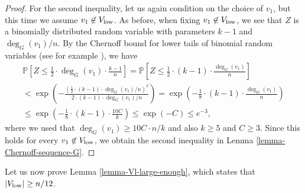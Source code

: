 \begin{proof}
For the second inequality, let us again condition on the choice of $v_1$, but this time we assume $v_1\not\in V_{\textnormal{low}}$. As before, when fixing $v_1\not\in V_{\textnormal{low}}$, we see that $Z$ is a binomially distributed random variable with parameters $k-1$ and $\deg_G(v_1)/n$. By the Chernoff bound for lower tails of binomial random variables (see for example \cite[Corollary A.1.13]{alon-spencer}), we have
\begin{multline*}
\mathbb{P}\left[Z\leq \frac{1}{2}\cdot \deg_G(v_1)\cdot \frac{k-1}{n}\right] =
\mathbb{P}\left[Z\leq \frac{1}{2}\cdot (k-1) \cdot \frac{\deg_G(v_1)}{n}\right]\\
<\exp\left(-\frac{\left(\frac{1}{2}\cdot (k-1)\cdot \deg_G(v_1)/n\right)^2}{2\cdot (k-1)\cdot \deg_G(v_1)/n}\right)=\exp\left(-\frac{1}{8}\cdot (k-1)\cdot \frac{\deg_G(v_1)}{n}\right)\\
\leq \exp\left(-\frac{1}{8}\cdot (k-1)\cdot \frac{10C}{k}\right)\leq \exp\left(-C\right)\leq e^{-3},
\end{multline*}
where we used that $\deg_G(v_1)\geq 10C\cdot n/k$ and also $k\geq 5$ and $C\geq 3$. Since this holds for every $v_1\not\in V_{\textnormal{low}}$, we obtain the second inequality in Lemma \ref{lemma-Chernoff-sequence-G}.
\end{proof}

Let us now prove Lemma \ref{lemma-Vl-large-enough}, which states that $\vert V_{\textnormal{low}}\vert\geq n/12$.

